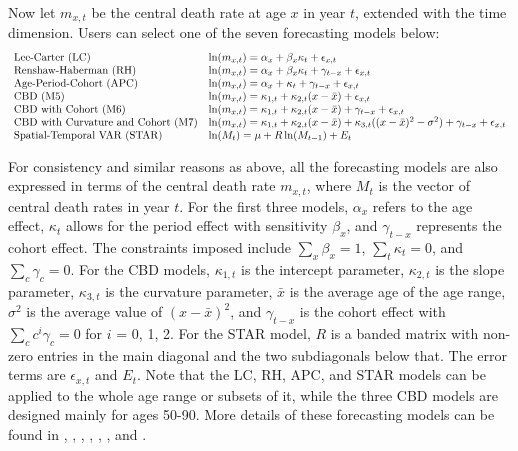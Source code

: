 Now let \(m_{x,t}\) be the central death rate at age \(x\) in year \(t\), extended with the time dimension. Users can select one of the seven forecasting models below:
\[
\begin{array}{l l}
\text{Lee-Carter (LC)} & \ln(m_{x,t}) = \alpha_x + \beta_x \kappa_t + \epsilon_{x,t} \\
\text{Renshaw-Haberman (RH)} & \ln(m_{x,t}) = \alpha_x + \beta_x \kappa_t + \gamma_{t-x} + \epsilon_{x,t} \\
\text{Age-Period-Cohort (APC)} & \ln(m_{x,t}) = \alpha_x + \kappa_t + \gamma_{t-x} + \epsilon_{x,t} \\
\text{CBD (M5)} & \ln(m_{x,t}) = \kappa_{1,t} + \kappa_{2,t} (x-\bar{x}) + \epsilon_{x,t} \\
\text{CBD with Cohort (M6)} & \ln(m_{x,t}) = \kappa_{1,t} + \kappa_{2,t} (x-\bar{x}) + \gamma_{t-x} + \epsilon_{x,t} \\
\text{CBD with Curvature and Cohort (M7)} & \ln(m_{x,t}) = \kappa_{1,t} + \kappa_{2,t} (x-\bar{x}) + \kappa_{3,t} ((x-\bar{x})^2-\sigma^2) + \gamma_{t-x} + \epsilon_{x,t} \\
\text{Spatial-Temporal VAR (STAR)} & \ln(M_{t}) = \mu + R \ln(M_{t-1}) + E_t \\
\end{array}
\]

For consistency and similar reasons as above, all the forecasting models are also expressed in terms of the central death rate \(m_{x,t}\), where \(M_t\) is the vector of central death rates in year \(t\). For the first three models, \(\alpha_x\) refers to the age effect, \(\kappa_t\) allows for the period effect with sensitivity \(\beta_x\), and \(\gamma_{t-x}\) represents the cohort effect. The constraints imposed include \(\sum_x \beta_x = 1\), \(\sum_t \kappa_t = 0\), and \(\sum_c \gamma_c = 0\). For the CBD models, \(\kappa_{1,t}\) is the intercept parameter, \(\kappa_{2,t}\) is the slope parameter, \(\kappa_{3,t}\) is the curvature parameter, \(\bar{x}\) is the average age of the age range, \(\sigma^2\) is the average value of \((x-\bar{x})^2\), and \(\gamma_{t-x}\) is the cohort effect with \(\sum_c c^i \gamma_c = 0\) for \(i\) = 0, 1, 2. For the STAR model, \(R\) is a banded matrix with non-zero entries in the main diagonal and the two subdiagonals below that. The error terms are \(\epsilon_{x,t}\) and \(E_t\). Note that the LC, RH, APC, and STAR models can be applied to the whole age range or subsets of it, while the three CBD models are designed mainly for ages 50-90. More details of these forecasting models can be found in \citet{Lee1992}, \citet{Bray2002}, \citet{Cairns2006}, \citet{Cairns2009}, \citet{Haberman2011}, \citet{LiLu2017}, and \citet{Li2024}.


